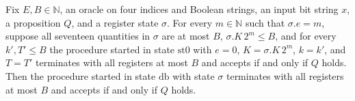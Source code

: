 \begin{theorem}
\label{Complexity.LogProg.ISGen.gdouble_run}
\leanok
{}
Fix $E,B\in\mathbb N$, an oracle on four indices and Boolean strings, an input bit
string $x$, a proposition $Q$, and a register state $\sigma$. For every $m\in\mathbb N$
such that $\sigma.e=m$, suppose all seventeen quantities in $\sigma$ are at most $B$,
$\sigma.K\,2^m\le B$, and for every $k',T'\le B$ the procedure started in state
$\mathrm{st0}$ with $e=0$, $K=\sigma.K\,2^m$, $k=k'$, and $T=T'$ terminates with all
registers at most $B$ and accepts if and only if $Q$ holds. Then the procedure started
in state $\mathrm{db}$ with state $\sigma$ terminates with all registers at most $B$ and
accepts if and only if $Q$ holds.
\end{theorem}

